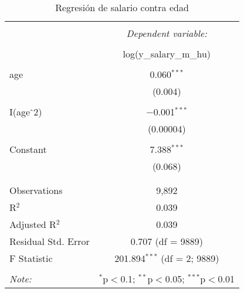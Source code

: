 
\begin{table}[!htbp] \centering 
  \caption{Regresión de salario contra edad} 
  \label{} 
\begin{tabular}{@{\extracolsep{5pt}}lc} 
\\[-1.8ex]\hline 
\hline \\[-1.8ex] 
 & \multicolumn{1}{c}{\textit{Dependent variable:}} \\ 
\cline{2-2} 
\\[-1.8ex] & log(y\_salary\_m\_hu) \\ 
\hline \\[-1.8ex] 
 age & 0.060$^{***}$ \\ 
  & (0.004) \\ 
  & \\ 
 I(age$\hat{\mkern6mu}$2) & $-$0.001$^{***}$ \\ 
  & (0.00004) \\ 
  & \\ 
 Constant & 7.388$^{***}$ \\ 
  & (0.068) \\ 
  & \\ 
\hline \\[-1.8ex] 
Observations & 9,892 \\ 
R$^{2}$ & 0.039 \\ 
Adjusted R$^{2}$ & 0.039 \\ 
Residual Std. Error & 0.707 (df = 9889) \\ 
F Statistic & 201.894$^{***}$ (df = 2; 9889) \\ 
\hline 
\hline \\[-1.8ex] 
\textit{Note:}  & \multicolumn{1}{r}{$^{*}$p$<$0.1; $^{**}$p$<$0.05; $^{***}$p$<$0.01} \\ 
\end{tabular} 
\end{table} 
